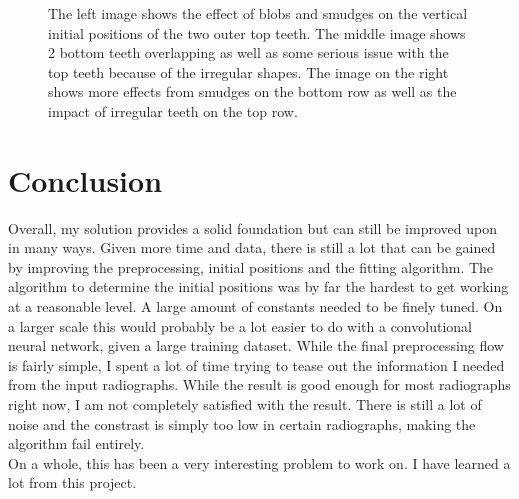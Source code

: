 \documentclass[a4paper,10pt]{article}
\begin{document}
\begin{figure}[!h]
\begin{tabular}{ccc}
\end{tabular}
 \caption{The left image shows the effect of blobs and smudges on the vertical initial positions of the two outer top teeth. The middle image shows 2 bottom teeth overlapping as well as some serious issue with the top teeth because of the irregular shapes. The image on the right shows more effects from smudges on the bottom row as well as the impact of irregular teeth on the top row. }
\end{figure}

\section{Conclusion}
Overall, my solution provides a solid foundation but can still be improved upon in many ways. Given more time and data, there is still a lot that can be gained by improving the preprocessing, initial positions and the fitting algorithm. The algorithm to determine the initial positions was by far the hardest to get working at a reasonable level. A large amount of constants needed to be finely tuned. On a larger scale this would probably be a lot easier to do with a convolutional neural network, given a large training dataset. While the final preprocessing flow is fairly simple, I spent a lot of time trying to tease out the information I needed from the input radiographs. While the result is good enough for most radiographs right now, I am not completely satisfied with the result. There is still a lot of noise and the constrast is simply too low in certain radiographs, making the algorithm fail entirely. \\ On a whole, this has been a very interesting problem to work on. I have learned a lot from this project.
 

\end{document}
